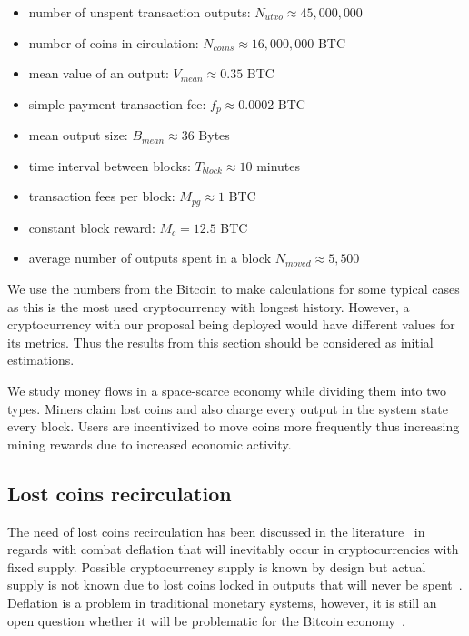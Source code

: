 \documentclass[]{llncs}   %
\begin{document}
\begin{itemize}
  \item number of unspent transaction outputs: $N_{utxo} \approx 45,000,000$
  \item number of coins in circulation: $N_{coins} \approx 16,000,000$ BTC
  \item mean value of an output: $V_{mean} \approx 0.35$ BTC
  \item simple payment transaction fee: $f_{p} \approx 0.0002$ BTC
  \item mean output size: $B_{mean} \approx 36$ Bytes
  \item time interval between blocks: $T_{block} \approx 10$ minutes
  \item transaction fees per block: $M_{pg} \approx 1$ BTC
  \item constant block reward: $M_c = 12.5$ BTC
  \item average number of outputs spent in a block $N_{moved} \approx 5,500$ 
\end{itemize}

We use the numbers from the Bitcoin to make calculations for some typical cases as this is the most used cryptocurrency with longest history. However, a cryptocurrency with our proposal being deployed would have different values for its metrics. Thus the results from this section should be considered as initial estimations.

We study money flows in a space-scarce economy while dividing them into two types. Miners claim lost coins and also charge every output in the system state every block. Users are incentivized to move coins more frequently thus increasing mining rewards due to increased economic activity.  

\subsection{Lost coins recirculation}
\label{sec:re}

The need of lost coins recirculation has been discussed in the literature~\cite{gjermundrod2014recirculating,gjermundrod2016going} in regards with combat deflation that will inevitably occur in cryptocurrencies with fixed supply. Possible cryptocurrency supply is known by design but actual supply is not known due to lost coins locked in outputs that will never be spent~\cite{ron2013quantitative}. Deflation is a problem in traditional monetary systems, however, it is still an open question whether it will be problematic for the Bitcoin economy~\cite{bitcoinDeflationarySpiral,barber2012bitter}.
\end{document}
